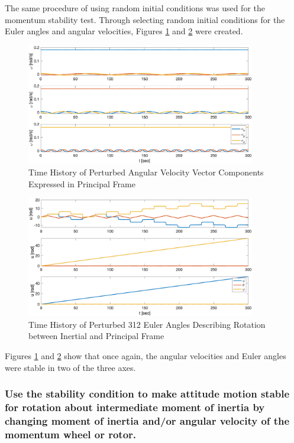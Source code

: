 The same procedure of using random initial conditions was used for the momentum stability test. Through selecting random initial conditions for the Euler angles and angular velocities, Figures \ref{fig:mom_wheel_stability_velocities} and \ref{fig:mom_wheel_stability_angles} were created.

\begin{figure}[H]
    \centering
    \captionsetup{ justification = centering}
    \includegraphics[width = 10cm]{Images/PS4/mom_wheel_stability_history_velocity.png}
    \caption{Time History of Perturbed Angular Velocity Vector Components Expressed in Principal Frame}
    \label{fig:mom_wheel_stability_velocities}
\end{figure}

\begin{figure}[H]
    \centering
    \captionsetup{justification = centering}
    \includegraphics[width = 10cm]{Images/PS4/mom_wheel_stability_history_angles.png}
    \caption{Time History of Perturbed 312 Euler Angles Describing Rotation between Inertial and Principal Frame}
    \label{fig:mom_wheel_stability_angles}
\end{figure}

Figures \ref{fig:mom_wheel_stability_velocities} and \ref{fig:mom_wheel_stability_angles} show that once again, the angular velocities and Euler angles were stable in two of the three axes. 

\subsubsection{Use the stability condition to make attitude motion stable for rotation about intermediate moment of inertia by changing moment of inertia and/or angular velocity of the momentum wheel or rotor.}



